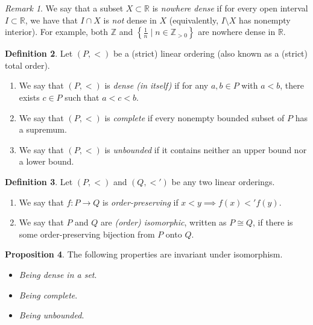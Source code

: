 \documentclass[10pt,letterpaper,cm]{nupset}
\theoremstyle{definition}
\newtheorem{definition}{Definition}[subsection]
\theoremstyle{theorem}
\newtheorem{prop}[definition]{Proposition}
\theoremstyle{remark}
\newtheorem{remark}[definition]{Remark}
\newcommand{\R}{\mathbb R}
\newcommand{\Z}{\mathbb Z}
\newcommand{\1}{\mathbf{1}}
\newcommand{\0}{\vec 0}
\begin{document}
\begin{remark}
We say that a subset $X\subset \R$ is \textit{nowhere dense} if for every  open interval $I\subset \R$, we have that $I \cap X$ is \emph{not} dense in $X$ (equivalently, $I\setminus X$ has nonempty interior). For example, both $\Z$ and  $\left\{\frac{1}{n} \mid n \in \Z_{>0}\right\}$ are nowhere dense in $\R$.
\end{remark}

\begin{definition} Let  $\left(P, <\right)$ be a (strict) linear ordering (also known as a (strict) total order).
\begin{enumerate}
\item We say that $\left(P, <\right)$  is \textit{dense (in itself)} if for any $a, b \in P$ with $a<b$, there exists   $c\in P$ such that $a<c<b$. 
\item We say that $\left(P, <\right)$ is \textit{complete} if every nonempty bounded subset of $P$ has a supremum. 
\item We say that $\left(P, <\right)$ is \textit{unbounded} if it contains neither an upper bound nor a lower bound. 
\end{enumerate}
\end{definition}

\begin{definition}
Let $\left(P, <\right)$ and $\left(Q, <'\right)$ be any two linear orderings. 
\begin{enumerate}
\item We say that $f : P \to Q$ is \textit{order-preserving} if $x< y \implies f(x) <' f(y)$.
\item We say that $P$ and $Q$ are \textit{(order) isomorphic}, written as $P\cong Q$, if there is some order-preserving bijection from $P$ onto $Q$.
\end{enumerate}
\end{definition}

\begin{prop}
The following  properties are invariant under isomorphism.
\begin{itemize}
\item \emph{Being dense in a set}.
\item \emph{Being complete}.
\item \emph{Being unbounded}. 
\end{itemize}
\end{prop}
\end{document}
